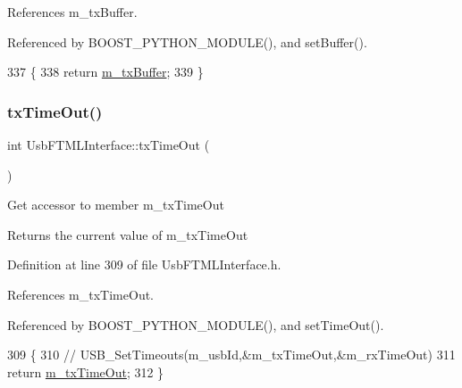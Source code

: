 References m\+\_\+tx\+Buffer.



Referenced by B\+O\+O\+S\+T\+\_\+\+P\+Y\+T\+H\+O\+N\+\_\+\+M\+O\+D\+U\+L\+E(), and set\+Buffer().


\begin{DoxyCode}
337                   \{
338     \textcolor{keywordflow}{return} \hyperlink{classUsbFTMLInterface_a4057fb62dc732ffe98df5c46231d7a23}{m\_txBuffer};
339   \}
\end{DoxyCode}
\mbox{\label{classUsbFTMLInterface_ad7e76fd952273faf094bf3475b2963da}} 
\subsubsection{\texorpdfstring{tx\+Time\+Out()}{txTimeOut()}}
{\footnotesize\ttfamily int Usb\+F\+T\+M\+L\+Interface\+::tx\+Time\+Out (\begin{DoxyParamCaption}{ }\end{DoxyParamCaption})\hspace{0.3cm}{\ttfamily [inline]}}

Get accessor to member m\+\_\+tx\+Time\+Out \begin{DoxyReturn}{Returns}
the current value of m\+\_\+tx\+Time\+Out 
\end{DoxyReturn}


Definition at line 309 of file Usb\+F\+T\+M\+L\+Interface.\+h.



References m\+\_\+tx\+Time\+Out.



Referenced by B\+O\+O\+S\+T\+\_\+\+P\+Y\+T\+H\+O\+N\+\_\+\+M\+O\+D\+U\+L\+E(), and set\+Time\+Out().


\begin{DoxyCode}
309                    \{
310     \textcolor{comment}{//    USB\_SetTimeouts(m\_usbId,&m\_txTimeOut,&m\_rxTimeOut)}
311     \textcolor{keywordflow}{return} \hyperlink{classUsbFTMLInterface_a48cd0df4e1d8fd53d96b208b5b9c7061}{m\_txTimeOut};
312   \}  
\end{DoxyCode}
\mbox{\label{classObject_a84f99f70f144a83e1582d1d0f84e4e62}} 
